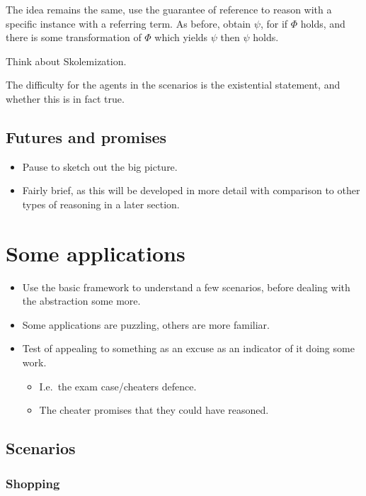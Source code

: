 \documentclass[10pt]{article}
\begin{document}
The idea remains the same, use the guarantee of reference to reason with a specific instance with a referring term.
As before, obtain \(\psi\), for if \(\Phi\) holds, and there is some transformation of \(\Phi\) which yields \(\psi\) then \(\psi\) holds.
\begin{note}
  Think about Skolemization.
\end{note}

The difficulty for the agents in the scenarios is the existential statement, and whether this is in fact true.


\subsection{Futures and promises}
\label{sec:futures-promises-1}

\begin{itemize}
\item Pause to sketch out the big picture.
\item Fairly brief, as this will be developed in more detail with comparison to other types of reasoning in a later section.
\end{itemize}

\section{Some applications}
\label{sec:some-applications}

\begin{itemize}
\item Use the basic framework to understand a few scenarios, before dealing with the abstraction some more.
\item Some applications are puzzling, others are more familiar.
\item Test of appealing to something as an excuse as an indicator of it doing some work.
  \begin{itemize}
  \item I.e.\ the exam case/cheaters defence.
  \item The cheater promises that they could have reasoned.
  \end{itemize}
\end{itemize}


\subsection{Scenarios}
\label{sec:scenarios}

\subsubsection{Shopping}
\label{sec:shopping-1}
\end{document}
